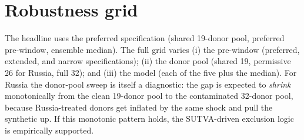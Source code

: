 \section{Robustness grid}\label{app:grid}
The headline uses the preferred specification (shared 19-donor pool, preferred pre-window,
ensemble median). The full grid varies (i) the pre-window (preferred, extended, and narrow
specifications); (ii) the donor pool (shared 19, permissive 26 for Russia, full 32); and
(iii) the model (each of the five plus the median). For Russia the donor-pool sweep is
itself a diagnostic: the gap is expected to \emph{shrink} monotonically from the clean
19-donor pool to the contaminated 32-donor pool, because Russia-treated donors get inflated
by the same shock and pull the synthetic up. If this monotonic pattern holds, the
SUTVA-driven exclusion logic is empirically supported.

